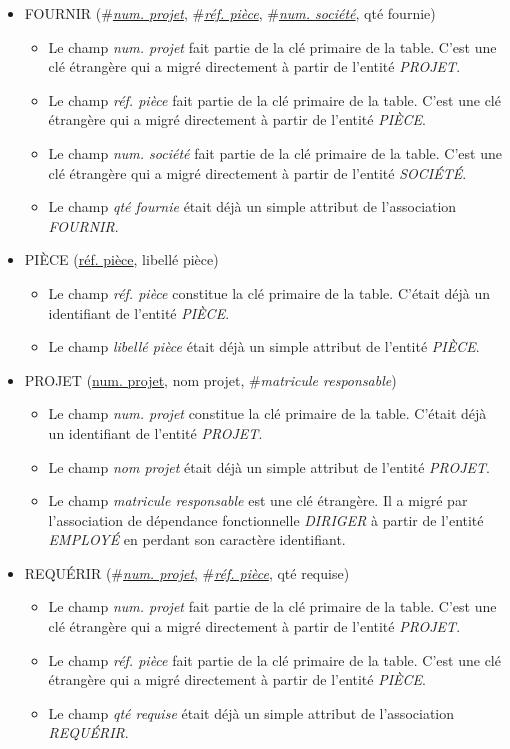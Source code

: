 \documentclass[a4paper]{article}
\newcommand{\relat}[1]{\textsc{#1}}
\newcommand{\attr}[1]{#1}
\newcommand{\prim}[1]{\uline{#1}}
\newcommand{\foreign}[1]{\#\textsl{#1}}
\begin{document}
\begin{itemize}
  \item \relat{FOURNIR} (\foreign{\prim{num. projet}}, \foreign{\prim{réf. pièce}}, \foreign{\prim{num. société}}, \attr{qté fournie})
  \begin{itemize}
    \item Le champ \emph{num. projet} fait partie de la clé primaire de la table. C'est une clé étrangère qui a migré directement à partir de l'entité \emph{PROJET}.
    \item Le champ \emph{réf. pièce} fait partie de la clé primaire de la table. C'est une clé étrangère qui a migré directement à partir de l'entité \emph{PIÈCE}.
    \item Le champ \emph{num. société} fait partie de la clé primaire de la table. C'est une clé étrangère qui a migré directement à partir de l'entité \emph{SOCIÉTÉ}.
    \item Le champ \emph{qté fournie} était déjà un simple attribut de l'association \emph{FOURNIR}.
  \end{itemize}

  \item \relat{PIÈCE} (\prim{réf. pièce}, \attr{libellé pièce})
  \begin{itemize}
    \item Le champ \emph{réf. pièce} constitue la clé primaire de la table. C'était déjà un identifiant de l'entité \emph{PIÈCE}.
    \item Le champ \emph{libellé pièce} était déjà un simple attribut de l'entité \emph{PIÈCE}.
  \end{itemize}

  \item \relat{PROJET} (\prim{num. projet}, \attr{nom projet}, \foreign{matricule responsable})
  \begin{itemize}
    \item Le champ \emph{num. projet} constitue la clé primaire de la table. C'était déjà un identifiant de l'entité \emph{PROJET}.
    \item Le champ \emph{nom projet} était déjà un simple attribut de l'entité \emph{PROJET}.
    \item Le champ \emph{matricule responsable} est une clé étrangère. Il a migré par l'association de dépendance fonctionnelle \emph{DIRIGER} à partir de l'entité \emph{EMPLOYÉ} en perdant son caractère identifiant.
  \end{itemize}

  \item \relat{REQUÉRIR} (\foreign{\prim{num. projet}}, \foreign{\prim{réf. pièce}}, \attr{qté requise})
  \begin{itemize}
    \item Le champ \emph{num. projet} fait partie de la clé primaire de la table. C'est une clé étrangère qui a migré directement à partir de l'entité \emph{PROJET}.
    \item Le champ \emph{réf. pièce} fait partie de la clé primaire de la table. C'est une clé étrangère qui a migré directement à partir de l'entité \emph{PIÈCE}.
    \item Le champ \emph{qté requise} était déjà un simple attribut de l'association \emph{REQUÉRIR}.
  \end{itemize}


\end{itemize}
\end{document}
